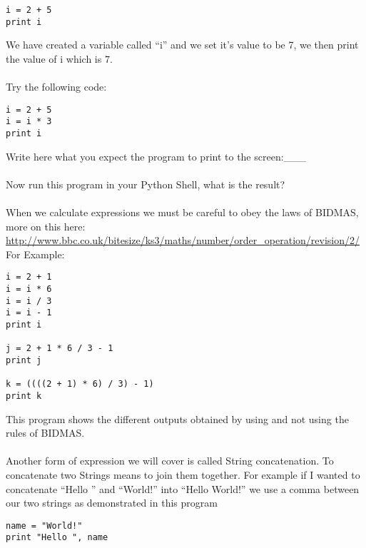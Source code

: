 \documentclass[twocolumn]{article}
\begin{document}
 \begin{lstlisting}
i = 2 + 5
print i
\end{lstlisting}
We have created a variable called ``i'' and we set it's value to be 7, we then print the value of i which is 7.\\
\\
Try the following code:
\begin{lstlisting}
i = 2 + 5
i = i * 3
print i
\end{lstlisting}
Write here what you expect the program to print to the screen:\_\_\_\\
\\
Now run this program in your Python Shell, what is the result?\\
\\
When we calculate expressions we must be careful to obey the laws of BIDMAS, more on this here: \url{http://www.bbc.co.uk/bitesize/ks3/maths/number/order\_operation/revision/2/}\\
For Example:
\begin{lstlisting}
i = 2 + 1
i = i * 6
i = i / 3
i = i - 1
print i

j = 2 + 1 * 6 / 3 - 1
print j

k = ((((2 + 1) * 6) / 3) - 1)
print k
\end{lstlisting}
This program shows the different outputs obtained by using and not using the rules of BIDMAS.\\
\\
Another form of expression we will cover is called String concatenation. To concatenate two Strings means to join them together. For example if I wanted to concatenate ``Hello '' and ``World!'' into ``Hello World!'' we use a comma between our two strings as demonstrated in this program
\begin{lstlisting}
name = "World!"
print "Hello ", name
\end{lstlisting}
\end{document}
